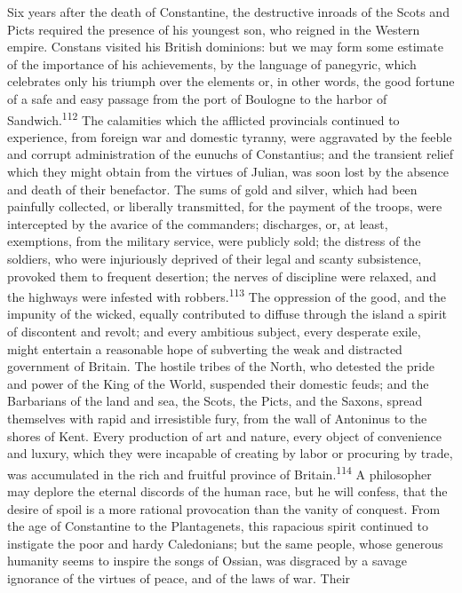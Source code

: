 Six years after the death of Constantine, the destructive inroads
of the Scots and Picts required the presence of his youngest son,
who reigned in the Western empire. Constans visited his British
dominions: but we may form some estimate of the importance of his
achievements, by the language of panegyric, which celebrates only
his triumph over the elements or, in other words, the good
fortune of a safe and easy passage from the port of Boulogne to
the harbor of Sandwich.\textsuperscript{112} The calamities which the afflicted
provincials continued to experience, from foreign war and
domestic tyranny, were aggravated by the feeble and corrupt
administration of the eunuchs of Constantius; and the transient
relief which they might obtain from the virtues of Julian, was
soon lost by the absence and death of their benefactor. The sums
of gold and silver, which had been painfully collected, or
liberally transmitted, for the payment of the troops, were
intercepted by the avarice of the commanders; discharges, or, at
least, exemptions, from the military service, were publicly sold;
the distress of the soldiers, who were injuriously deprived of
their legal and scanty subsistence, provoked them to frequent
desertion; the nerves of discipline were relaxed, and the
highways were infested with robbers.\textsuperscript{113} The oppression of the
good, and the impunity of the wicked, equally contributed to
diffuse through the island a spirit of discontent and revolt; and
every ambitious subject, every desperate exile, might entertain a
reasonable hope of subverting the weak and distracted government
of Britain. The hostile tribes of the North, who detested the
pride and power of the King of the World, suspended their
domestic feuds; and the Barbarians of the land and sea, the
Scots, the Picts, and the Saxons, spread themselves with rapid
and irresistible fury, from the wall of Antoninus to the shores
of Kent. Every production of art and nature, every object of
convenience and luxury, which they were incapable of creating by
labor or procuring by trade, was accumulated in the rich and
fruitful province of Britain.\textsuperscript{114} A philosopher may deplore the
eternal discords of the human race, but he will confess, that the
desire of spoil is a more rational provocation than the vanity of
conquest. From the age of Constantine to the Plantagenets, this
rapacious spirit continued to instigate the poor and hardy
Caledonians; but the same people, whose generous humanity seems
to inspire the songs of Ossian, was disgraced by a savage
ignorance of the virtues of peace, and of the laws of war. Their

